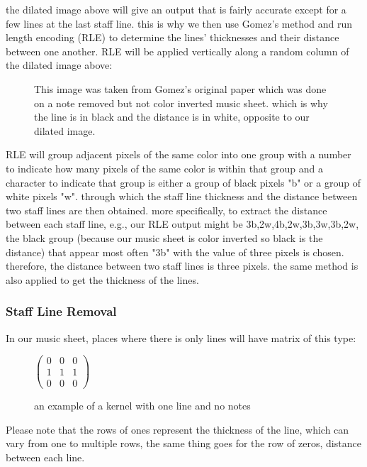 \documentclass[final]{cvpr}
\begin{document}
the dilated image above will give an output that is fairly accurate except for a
few lines at the last staff line. this is why we then use Gomez's
method \cite{Gomez2017} and run length encoding (RLE) to determine the lines' thicknesses and
their distance between one another. RLE will be applied vertically along a
random column of the dilated image above:

\begin{figure}[ht]
\caption{This image was taken from Gomez's original paper \cite{Gomez2017} which was done on a
note removed but not color inverted music sheet. which is why the line is in
black and the distance is in white, opposite to our dilated image.}
\end{figure}


RLE will group adjacent pixels of the same color into one group with a number to
indicate how many pixels of the same color is within that group and a character
to indicate that group is either a group of black pixels "b" or a group of white
pixels "w". through which the staff line thickness and the distance between two
staff lines are then obtained. more specifically, to extract the distance between each
staff line, e.g., our RLE output might be 3b,2w,4b,2w,3b,3w,3b,2w, the black
group (because our music sheet is color inverted so black is the distance) that
appear most often "3b" with the value of three pixels is chosen. therefore, the
distance between two staff lines is three pixels. the same method is also applied
to get the thickness of the lines.

\subsubsection{Staff Line Removal}
In our music sheet, places where there is only lines will have matrix of 
this type:

\begin{figure}[ht]
    \centering
    $
\begin{pmatrix}
	0 & 0 & 0\\
	1 & 1 & 1\\
	0 & 0 & 0
\end{pmatrix}
$\\
\caption{an example of a kernel with one line and no notes}
\label{line only matrix}
\end{figure}


Please note that the rows of ones represent the thickness of the line, which can
vary from one to multiple rows, the same thing goes for the row of zeros, distance
between each line.
\end{document}
